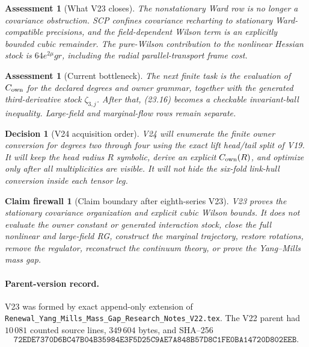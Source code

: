 \documentclass[11pt,oneside]{book}
\newtheorem{assessment}[theorem]{Assessment}
\newtheorem{firewall}[theorem]{Claim firewall}
\newtheorem{decision}[theorem]{Decision}
\theoremstyle{definition}
\theoremstyle{remark}
\begin{document}
\begin{assessment}[What V23 closes]
\label{ass:e8v23-closes}
The nonstationary Ward row is no longer a covariance obstruction.
SCP confines covariance recharting to stationary Ward-compatible
precisions, and the field-dependent Wilson term is an explicitly
bounded cubic remainder.  The pure-Wilson contribution to the
nonlinear Hessian stock is \(64e^{2\mu}gr\), including the radial
parallel-transport frame cost.
\end{assessment}

\begin{assessment}[Current bottleneck]
\label{ass:e8v23-remains}
The next finite task is the evaluation of \(C_{\rm own}\) for the
declared degrees and owner grammar, together with the generated
third-derivative stock \(\zeta_{3,j}\).  After that, (23.16) becomes a
checkable invariant-ball inequality.  Large-field and marginal-flow
rows remain separate.
\end{assessment}

\begin{decision}[V24 acquisition order]
\label{dec:e8v23-v24}
V24 will enumerate the finite owner conversion for degrees two
through four using the exact lift head/tail split of V19.  It will
keep the head radius \(R\) symbolic, derive an explicit
\(C_{\rm own}(R)\), and optimize only after all multiplicities are
visible.  It will not hide the six-fold link-hull conversion inside
each tensor leg.
\end{decision}

\begin{firewall}[Claim boundary after eighth-series V23]
\label{fire:e8v23-claim}
V23 proves the stationary covariance organization and explicit cubic
Wilson bounds.  It does not evaluate the owner constant or generated
interaction stock, close the full nonlinear and large-field RG,
construct the marginal trajectory, restore rotations, remove the
regulator, reconstruct the continuum theory, or prove the
Yang--Mills mass gap.
\end{firewall}

\paragraph{Parent-version record.}
V23 was formed by exact append-only extension of
\texttt{Renewal\_Yang\_Mills\_Mass\_Gap\_Research\_Notes\_V22.tex}.
The V22 parent had \(10\,081\) counted source lines,
\(349\,604\) bytes, and SHA--256
\[
\texttt{72EDE7370D6BC47B04B35984E3F5D25C9AE7A848B57D8C1FE0BA14720D802EEB}.
\]
\end{document}
